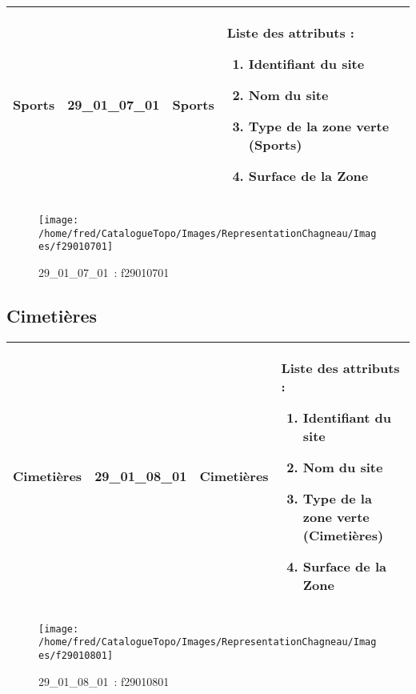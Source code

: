 \documentclass[12pt,titlepage]{book}
\begin{document}
\renewcommand{\arraystretch}{1.2}
\begin{supertabular}{|p{10cm}|c|p{13cm}|p{12cm}|}
 Sports & 29\_01\_07\_01 & Sports & Liste des attributs :
\begin{enumerate}
  \item Identifiant du site  \item Nom du site  \item Type de la zone verte (Sports)  \item Surface de la Zone\end{enumerate}
\\
\hline
\end{supertabular}
\begin{figure}[h!]
  \hfill         %
  \begin{minipage}[t]{3cm}
    \begin{center}
      \texttt{[image: /home/fred/CatalogueTopo/Images/RepresentationChagneau/Images/f29010701]}
      \caption[~29\_01\_07\_01]{\small{29\_01\_07\_01~:} \tiny{f29010701}}\label{f29010701}
    \end{center}
  \end{minipage}
\end{figure}


\subsection{Cimetières}
\noindent
\vspace{\baselineskip}

\renewcommand{\arraystretch}{1.2}
\begin{supertabular}{|p{10cm}|c|p{13cm}|p{12cm}|}
 Cimetières & 29\_01\_08\_01 & Cimetières & Liste des attributs :
\begin{enumerate}
  \item Identifiant du site  \item Nom du site  \item Type de la zone verte (Cimetières)  \item Surface de la Zone\end{enumerate}
\\
\hline
\end{supertabular}
\begin{figure}[h!]
  \hfill         %
  \begin{minipage}[t]{3cm}
    \begin{center}
      \texttt{[image: /home/fred/CatalogueTopo/Images/RepresentationChagneau/Images/f29010801]}
      \caption[~29\_01\_08\_01]{\small{29\_01\_08\_01~:} \tiny{f29010801}}\label{f29010801}
    \end{center}
  \end{minipage}
\end{figure}
\end{document}
